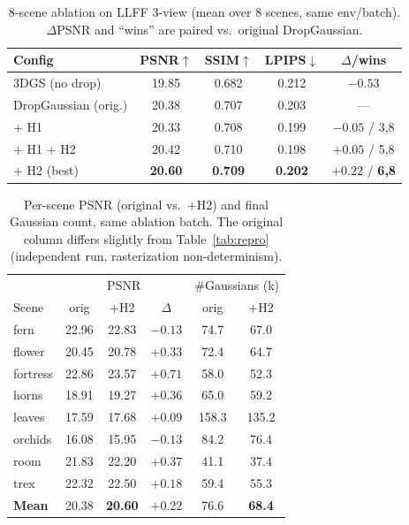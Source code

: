 \documentclass[conference]{IEEEtran}
\begin{document}
\begin{table}[t]
\caption{8-scene ablation on LLFF 3-view (mean over 8 scenes, same env/batch).
$\Delta$PSNR and ``wins'' are paired vs.\ original DropGaussian.}
\label{tab:ablation}
\centering
\small
\begin{tabular}{lcccc}
\toprule
Config & PSNR$\uparrow$ & SSIM$\uparrow$ & LPIPS$\downarrow$ & $\Delta$/wins \\
\midrule
3DGS (no drop)        & 19.85 & 0.682 & 0.212 & $-0.53$ \\
DropGaussian (orig.)  & 20.38 & 0.707 & 0.203 & --- \\
\;+ H1                & 20.33 & 0.708 & 0.199 & $-0.05$ / 3{,}8 \\
\;+ H1 + H2           & 20.42 & 0.710 & 0.198 & $+0.05$ / 5{,}8 \\
\rowcolor{gray!15}
\;+ H2 (best)         & \textbf{20.60} & \textbf{0.709} & \textbf{0.202} & $\mathbf{+0.22}$ / \textbf{6{,}8} \\
\bottomrule
\end{tabular}
\end{table}

\begin{table}[t]
\caption{Per-scene PSNR (original vs.\ +H2) and final Gaussian count, same ablation
batch. The original column differs slightly from Table~\ref{tab:repro} (independent run,
rasterization non-determinism).}
\label{tab:perscene}
\centering
\small
\begin{tabular}{lccc|cc}
\toprule
 & \multicolumn{3}{c|}{PSNR} & \multicolumn{2}{c}{\#Gaussians (k)} \\
Scene & orig & +H2 & $\Delta$ & orig & +H2 \\
\midrule
fern     & 22.96 & 22.83 & $-0.13$ & 74.7 & 67.0 \\
flower   & 20.45 & 20.78 & $+0.33$ & 72.4 & 64.7 \\
fortress & 22.86 & 23.57 & $+0.71$ & 58.0 & 52.3 \\
horns    & 18.91 & 19.27 & $+0.36$ & 65.0 & 59.2 \\
leaves   & 17.59 & 17.68 & $+0.09$ & 158.3 & 135.2 \\
orchids  & 16.08 & 15.95 & $-0.13$ & 84.2 & 76.4 \\
room     & 21.83 & 22.20 & $+0.37$ & 41.1 & 37.4 \\
trex     & 22.32 & 22.50 & $+0.18$ & 59.4 & 55.3 \\
\midrule
\textbf{Mean} & 20.38 & \textbf{20.60} & $\mathbf{+0.22}$ & 76.6 & \textbf{68.4} \\
\bottomrule
\end{tabular}
\end{table}
\end{document}
